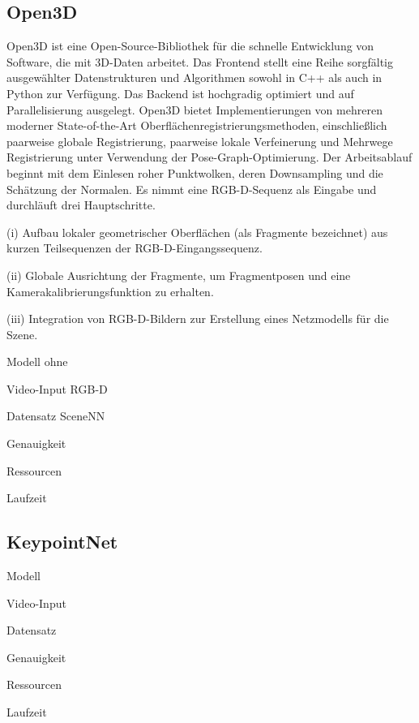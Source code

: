 \documentclass[a4paper, 11pt]{article}
\begin{document}
\begin{multicols*}{2}
    \subsection{Open3D}
    Open3D\cite{ICP} ist eine Open-Source-Bibliothek für die schnelle Entwicklung von Software, die mit 3D-Daten arbeitet.
    Das Frontend stellt eine Reihe sorgfältig ausgewählter Datenstrukturen und Algorithmen sowohl in C++ als auch in Python zur Verfügung. Das Backend ist hochgradig optimiert und auf Parallelisierung ausgelegt.
    Open3D bietet Implementierungen von mehreren moderner State-of-the-Art Oberflächenregistrierungsmethoden, einschließlich paarweise globale Registrierung, paarweise lokale Verfeinerung und Mehrwege Registrierung unter Verwendung der Pose-Graph-Optimierung.
    Der Arbeitsablauf beginnt mit dem Einlesen roher Punktwolken, deren Downsampling und die Schätzung der Normalen.
    Es nimmt eine RGB-D-Sequenz als Eingabe und durchläuft drei Hauptschritte.
    
    (i) Aufbau lokaler geometrischer Oberflächen (als Fragmente bezeichnet) aus kurzen Teilsequenzen der RGB-D-Eingangssequenz.

    (ii) Globale Ausrichtung der Fragmente, um Fragmentposen und eine Kamerakalibrierungsfunktion zu erhalten.

    (iii) Integration von RGB-D-Bildern zur Erstellung eines Netzmodells für die Szene.

    \begin{description*}
        \item[Modell] ohne
        \item[Video-Input] RGB-D
        \item[Datensatz] SceneNN\cite{scenenn}
        \item[Genauigkeit]
        \item[Ressourcen]
        \item[Laufzeit]
    \end{description*}

    \subsection{KeypointNet}

    \begin{description*}
        \item[Modell]
        \item[Video-Input]
        \item[Datensatz]
        \item[Genauigkeit]
        \begin{itemize*}
            \item
        \end{itemize*}
        \item[Ressourcen]
        \item[Laufzeit]
    \end{description*}


\end{multicols*}
\end{document}
